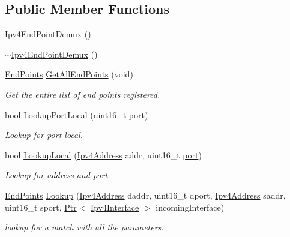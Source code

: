 \subsection*{Public Member Functions}
\begin{DoxyCompactItemize}
\item 
\hyperlink{classns3_1_1Ipv4EndPointDemux_ab3def84030003695c9811a21edfc5edd}{Ipv4\+End\+Point\+Demux} ()
\item 
\hyperlink{classns3_1_1Ipv4EndPointDemux_a679dc1702c275783075bd9f27ad9022e}{$\sim$\+Ipv4\+End\+Point\+Demux} ()
\item 
\hyperlink{classns3_1_1Ipv4EndPointDemux_a506a9661c08e2a64dab09ad6613d3b45}{End\+Points} \hyperlink{classns3_1_1Ipv4EndPointDemux_a47fe377300406d38259f176179b71cd6}{Get\+All\+End\+Points} (void)
\begin{DoxyCompactList}\small\item\em Get the entire list of end points registered. \end{DoxyCompactList}\item 
bool \hyperlink{classns3_1_1Ipv4EndPointDemux_adf65821503bc330fbb617af0f0e8df24}{Lookup\+Port\+Local} (uint16\+\_\+t \hyperlink{visualizer-ideas_8txt_a21ff1c530daf8435e00048b7fc2c58e3}{port})
\begin{DoxyCompactList}\small\item\em Lookup for port local. \end{DoxyCompactList}\item 
bool \hyperlink{classns3_1_1Ipv4EndPointDemux_a7f2e231efb21e0088d0fb4a41598df85}{Lookup\+Local} (\hyperlink{classns3_1_1Ipv4Address}{Ipv4\+Address} addr, uint16\+\_\+t \hyperlink{visualizer-ideas_8txt_a21ff1c530daf8435e00048b7fc2c58e3}{port})
\begin{DoxyCompactList}\small\item\em Lookup for address and port. \end{DoxyCompactList}\item 
\hyperlink{classns3_1_1Ipv4EndPointDemux_a506a9661c08e2a64dab09ad6613d3b45}{End\+Points} \hyperlink{classns3_1_1Ipv4EndPointDemux_acd458004b74ea330e9025ab874f2c1b1}{Lookup} (\hyperlink{classns3_1_1Ipv4Address}{Ipv4\+Address} daddr, uint16\+\_\+t dport, \hyperlink{classns3_1_1Ipv4Address}{Ipv4\+Address} saddr, uint16\+\_\+t sport, \hyperlink{classns3_1_1Ptr}{Ptr}$<$ \hyperlink{classns3_1_1Ipv4Interface}{Ipv4\+Interface} $>$ incoming\+Interface)
\begin{DoxyCompactList}\small\item\em lookup for a match with all the parameters. \end{DoxyCompactList}\item 

\end{DoxyCompactItemize}
